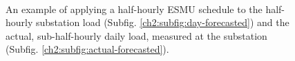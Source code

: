 \begin{figure}\centering
	\\
	\caption{An example of applying a half-hourly ESMU schedule to the half-hourly substation load (Subfig. \ref{ch2:subfig:day-forecasted}) and the actual, sub-half-hourly daily load, measured at the substation (Subfig. \ref{ch2:subfig:actual-forecasted}).}
	\label{ch2:fig:cost-sample}
\end{figure}